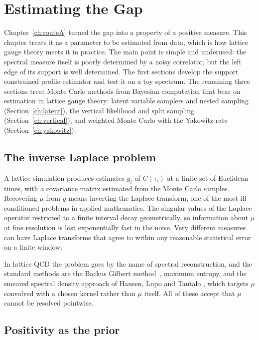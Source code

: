 \chapter{Estimating the Gap}\label{ch:estimation}

Chapter~\ref{ch:routeA} turned the gap into a property of a positive measure. This chapter treats it as a parameter to be estimated from data, which is how lattice gauge theory meets it in practice. The main point is simple and underused: the spectral measure itself is poorly determined by a noisy correlator, but the left edge of its support is well determined. The first sections develop the support constrained profile estimator and test it on a toy spectrum. The remaining three sections treat Monte Carlo methods from Bayesian computation that bear on estimation in lattice gauge theory: latent variable samplers and nested sampling (Section~\ref{ch:latent}), the vertical likelihood and split sampling (Section~\ref{ch:vertical}), and weighted Monte Carlo with the Yakowitz rate (Section~\ref{ch:yakowitz}).

\section{The inverse Laplace problem}

A lattice simulation produces estimates $y_i$ of $C(\tau_i)$ at a finite set of Euclidean times, with a covariance matrix estimated from the Monte Carlo samples. Recovering $\mu$ from $y$ means inverting the Laplace transform, one of the most ill conditioned problems in applied mathematics. The singular values of the Laplace operator restricted to a finite interval decay geometrically, so information about $\mu$ at fine resolution is lost exponentially fast in the noise. Very different measures can have Laplace transforms that agree to within any reasonable statistical error on a finite window.

In lattice QCD the problem goes by the name of spectral reconstruction, and the standard methods are the Backus Gilbert method~\cite{BG68}, maximum entropy, and the smeared spectral density approach of Hansen, Lupo and Tantalo \cite{HLT}, which targets $\mu$ convolved with a chosen kernel rather than $\mu$ itself. All of these accept that $\mu$ cannot be resolved pointwise.

\section{Positivity as the prior}

